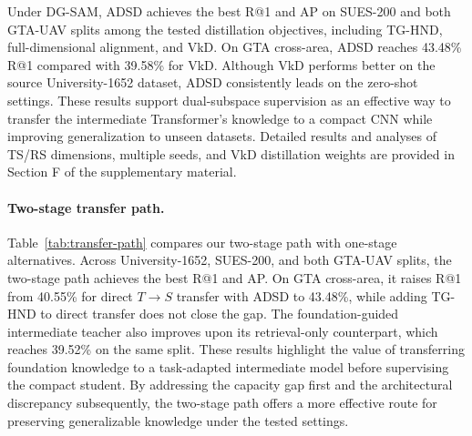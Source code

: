 Under DG-SAM, ADSD achieves the best R@1 and AP on SUES-200 and both GTA-UAV splits among the tested distillation objectives, including TG-HND, full-dimensional alignment, and VkD. On GTA cross-area, ADSD reaches 43.48\% R@1 compared with 39.58\% for VkD. Although VkD performs better on the source University-1652 dataset, ADSD consistently leads on the zero-shot settings. These results support dual-subspace supervision as an effective way to transfer the intermediate Transformer's knowledge to a compact CNN while improving generalization to unseen datasets. Detailed results and analyses of TS/RS dimensions, multiple seeds, and VkD distillation weights are provided in Section F of the supplementary material.


\par\medskip\noindent\begin{minipage}{\columnwidth}
\captionsetup{type=table}

\end{minipage}\par\medskip
\par\medskip\noindent\begin{minipage}{\columnwidth}
\captionsetup{type=table}

\end{minipage}\par\medskip
\paragraph{Two-stage transfer path.}Table~\ref{tab:transfer-path} compares our two-stage path with one-stage alternatives. Across University-1652, SUES-200, and both GTA-UAV splits, the two-stage path achieves the best R@1 and AP. On GTA cross-area, it raises R@1 from 40.55\% for direct $T\rightarrow S$ transfer with ADSD to 43.48\%, while adding TG-HND to direct transfer does not close the gap. The foundation-guided intermediate teacher also improves upon its retrieval-only counterpart, which reaches 39.52\% on the same split. These results highlight the value of transferring foundation knowledge to a task-adapted intermediate model before supervising the compact student. By addressing the capacity gap first and the architectural discrepancy subsequently, the two-stage path offers a more effective route for preserving generalizable knowledge under the tested settings.
